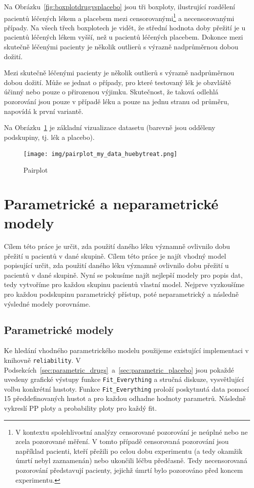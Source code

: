 \documentclass[a4, 11pt]{article}
\theoremstyle{definition}
\theoremstyle{remark}
\begin{document}
	Na Obrázku~\ref{fig:boxplotdrugvsplacebo} jsou tři boxploty, ilustrující rozdělení pacientů léčených lékem a placebem mezi censorovanými\footnote{V kontextu spolehlivostní analýzy censorované pozorování je neúplné nebo ne zcela pozorované měření. V tomto případě censorovaná pozorování jsou například pacienti, kteří přežili po celou dobu experimentu (a tedy okamžik úmrtí nebyl zaznamenán) nebo ukončili léčbu předčasně. Tedy necensorovaná pozorování představují pacienty, jejichž úmrtí bylo pozorováno před koncem experimentu.} a necensorovanými případy. 
	Na všech třech boxplotech je vidět, že střední hodnota doby přežití je u pacientů léčených lékem vyšší, než u pacientů léčených placebem. Dokonce mezi skutečně léčenými pacienty je několik outlierů s výrazně nadprůměrnou dobou dožití.
	 
	Mezi skutečně léčenými pacienty je několik outlierů s výrazně nadprůměrnou dobou dožití. Může se jednat o případy, pro které testovaný lék je obzvláště účinný nebo pouze o přirozenou výjimku. Skutečnost, že taková odlehlá pozorování jsou pouze v případě léku a pouze na jednu stranu od průměru, napovídá k první variantě.
	
	Na Obrázku~\ref{fig:pairplot_my_data} je základní vizualizace datasetu (barevně jsou odděleny podskupiny, tj. lék a placebo).
	
	\begin{figure}%
		\centering
		\texttt{[image: img/pairplot\_my\_data\_huebytreat.png]}
		\caption{Pairplot}
		\label{fig:pairplot_my_data}
	\end{figure}
	

	\section{Parametrické a neparametrické modely}
    Cílem této práce je určit, zda použití daného léku významně ovlivnilo dobu přežití u pacientů v dané skupině. 
    Cílem této práce je najít vhodný model popisující určit, zda použití daného léku významně ovlivnilo dobu přežití u pacientů v dané skupině. 
	Nyní se pokusíme najít nejlepší modely pro popis dat, tedy vytvoříme pro každou skupinu pacientů vlastní model. Nejprve vyzkoušíme pro každou podskupinu parametrický přístup, poté neparametrický a následně výsledné modely porovnáme.
	
	
	\subsection{Parametrické modely} \label{sec:parametric_all}
	Ke hledání vhodného parametrického modelu použijeme existující implementaci v knihovně \texttt{reliability}. 
	V Podsekcích~\ref{sec:parametric_drugs}~a~\ref{sec:parametric_placebo} jsou pokaždé uvedeny grafické výstupy funkce \texttt{Fit\_Everything} a stručná diskuze, vysvětlující volbu konkrétní hustoty.
	Funkce \texttt{Fit\_Everything} proloží poskytnutá data pomocí 15 předdefinovaných hustot a pro každou odhadne hodnoty parametrů. Následně vykreslí PP ploty a probability ploty pro každý fit.
	
\end{document}
